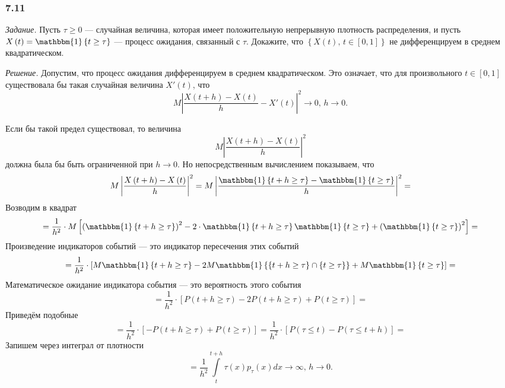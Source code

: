 \subsubsection*{7.11}

\textit{Задание.}
Пусть $ \tau \geq 0$ --- случайная величина,
которая имеет положительную непрерывную плотность распределения,
и пусть $X \left( t \right) = \mathbbm{1} \left\{ t \geq \tau \right\} $ --- процесс ожидания,
связанный с $ \tau $.
Докажите, что $ \left\{ X \left( t \right), \, t \in \left[ 0, 1 \right] \right\} $
не дифференцируем в среднем квадратическом.

\textit{Решение.}
Допустим, что процесс ожидания дифференцируем в среднем квадратическом.
Это означает, что для произвольного $t \in \left[ 0, 1 \right] $
существовала бы такая случайная величина $X' \left( t \right) $, что
$$M \left| \frac{X \left( t + h \right) - X \left( t \right) }{h} - X' \left( t \right) \right|^2 \to
  0, \,
  h \to 0.$$

Если бы такой предел существовал, то величина
$$M \left| \frac{X \left( t + h \right) - X \left( t \right) }{h} \right|^2$$
должна была бы быть ограниченной при $h \to 0$.
Но непосредственным вычислением показываем, что
$$M \left| \frac{X \left( t + h \right) - X \left( t \right) }{h} \right|^2 =
  M \left|
    \frac{ \mathbbm{1} \left\{ t + h \geq \tau \right\} - \mathbbm{1} \left\{ t \geq \tau \right\} }{h}
  \right|^2 =$$
Возводим в квадрат
$$= \frac{1}{h^2} \cdot M \left[
    \left( \mathbbm{1} \left\{ t + h \geq \tau \right\} \right)^2 -
    2 \cdot \mathbbm{1} \left\{ t + h \geq \tau \right\} \mathbbm{1} \left\{ t \geq \tau \right\} +
    \left( \mathbbm{1} \left\{ t \geq \tau \right\} \right)^2
  \right] =$$
Произведение индикаторов событий --- это индикатор пересечения этих событий
$$= \frac{1}{h^2} \cdot \left[
    M \mathbbm{1} \left\{ t + h \geq \tau \right\} -
    2M \mathbbm{1} \left\{
      \left\{ t + h \geq \tau \right\} \cap \left\{ t \geq \tau \right\} \right\} +
    M \mathbbm{1} \left\{ t \geq \tau \right\} \right] =$$
Математическое ожидание индикатора события --- это вероятность этого события
$$= \frac{1}{h^2} \cdot \left[
    P \left( t + h \geq \tau \right) - 2P \left( t + h \geq \tau \right) +
    P \left( t \geq \tau \right) \right] =$$
Приведём подобные
$$= \frac{1}{h^2} \cdot
  \left[ -P \left( t + h \geq \tau \right) + P \left( t \geq \tau \right) \right] =
  \frac{1}{h^2} \cdot
  \left[ P \left( \tau \leq t \right) - P \left( \tau \leq t + h \right) \right] =$$
Запишем через интеграл от плотности
$$= \frac{1}{h^2} \int \limits_t^{t + h} \tau \left( x \right) p_{ \tau } \left( x \right) dx \to
  \infty, \,
  h \to 0.$$

